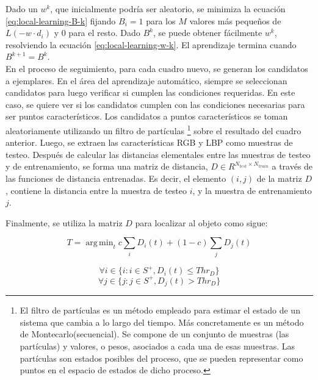 \documentclass[a4paper,10pt]{article}
\DeclareMathOperator*{\argmin}{arg\,min}
\begin{document}
Dado un $w^{k}$, que inicialmente podría ser aleatorio, se minimiza la ecuación
\ref{eq:local-learning-B-k} fijando $B_{i} = 1$ para los $M$ valores más
pequeños de $L(-w \cdot d_{i})$ y $0$ para el resto. Dado $B^{k}$, se puede
obtener fácilmente $w^{k}$, resolviendo la ecuación \ref{eq:local-learning-w-k}.
El aprendizaje termina cuando $B^{k+1}=B^{k}$.\\

En el proceso de seguimiento, para cada cuadro nuevo, se generan los candidatos
a ejemplares. En el área del aprendizaje automático, siempre se seleccionan
candidatos para luego verificar si cumplen las condiciones requeridas. En este
caso, se quiere ver si los candidatos cumplen con las condiciones necesarias
para ser puntos característicos. Los candidatos a puntos característicos se
toman aleatoriamente utilizando un filtro de partículas
\footnote{El filtro de partículas es un método empleado para estimar el estado
  de un sistema que cambia a lo largo del tiempo. Más concretamente es un
  método de Montecarlo(secuencial). Se compone de un conjunto de muestras (las
  partículas) y valores, o pesos, asociados a cada una de esas muestras.
  Las partículas son estados posibles del proceso, que se pueden representar
  como puntos en el espacio de estados de dicho proceso.}
sobre el resultado del cuadro anterior. Luego, se extraen las características
RGB y LBP como muestras de testeo. Después de calcular las distancias
elementales entre las muestras de testeo y de entrenamiento, se forma una
matriz de distancia, $D \in R^{N_{test} \times N_{train}}$ a través de las
funciones de distancia entrenadas. Es decir, el elemento $(i,j)$ de la matriz
$D$, contiene la distancia entre la muestra de testeo $i$, y la muestra de
entrenamiento $j$.

Finalmente, se utiliza la matriz $D$ para localizar al objeto como sigue:

\begin{equation}
    T = \argmin_{t} c \sum_{i} D_{i}(t) + (1 - c) \sum_{j} D_{j}(t)
\end{equation}

\begin{equation}
    \forall i \in \{i : i \in S^{+}, D_{i}(t) \leq Thr_{D} \}
\end{equation}
\begin{equation}
    \forall j \in \{j : j \in S^{+}, D_{j}(t) > Thr_{D} \}
\end{equation}
\end{document}
